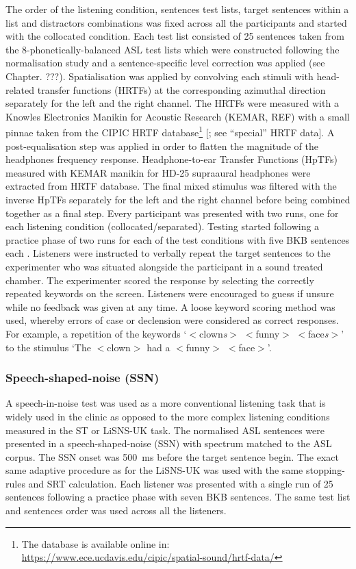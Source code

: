 \documentclass[a4paper, twoside]{templates/ociamthesis}
\begin{document}
The order of the listening condition, sentences test lists, target sentences within a list and distractors combinations was fixed across all the participants and started with the collocated condition. Each test list consisted of 25 sentences taken from the 8-phonetically-balanced ASL test lists which were constructed following the normalisation study and a sentence-specific level correction was applied (see Chapter. ???). Spatialisation was applied by convolving each stimuli with head-related transfer functions (HRTFs) at the corresponding azimuthal direction separately for the left and the right channel. The HRTFs were measured with a Knowles Electronics Manikin for Acoustic Research (KEMAR, REF) with a small pinnae taken from the CIPIC HRTF database\footnote{The database is available online in: \url{https://www.ece.ucdavis.edu/cipic/spatial-sound/hrtf-data/}} {[}\textcite{Algazi2001}; see ``special'' HRTF data{]}. A post-equalisation step was applied in order to flatten the magnitude of the headphones frequency response. Headphone-to-ear Transfer Functions (HpTFs) measured with KEMAR manikin for HD-25 supraaural headphones were extracted from \textcite{Wierstorf2011} HRTF database. The final mixed stimulus was filtered with the inverse HpTFs separately for the left and the right channel before being combined together as a final step. Every participant was presented with two runs, one for each listening condition (collocated/separated). Testing started following a practice phase of two runs for each of the test conditions with five BKB sentences each \autocite{Bench1979}. Listeners were instructed to verbally repeat the target sentences to the experimenter who was situated alongside the participant in a sound treated chamber. The experimenter scored the response by selecting the correctly repeated keywords on the screen. Listeners were encouraged to guess if unsure while no feedback was given at any time. A loose keyword scoring method was used, whereby errors of case or declension were considered as correct responses. For example, a repetition of the keywords `\(<\)clown\emph{s}\(>\) \(<\)funny\(>\) \(<\)face\emph{s}\(>\)' to the stimulus `The \(<\)clown\(>\) had a \(<\)funny\(>\) \(<\)face\(>\)'.

\hypertarget{speech-shaped-noise-ssn}{%
\subsubsection{Speech-shaped-noise (SSN)}\label{speech-shaped-noise-ssn}}

A speech-in-noise test was used as a more conventional listening task that is widely used in the clinic as opposed to the more complex listening conditions measured in the ST or LiSNS-UK task. The normalised ASL sentences were presented in a speech-shaped-noise (SSN) with spectrum matched to the ASL corpus. The SSN onset was 500~ms before the target sentence begin. The exact same adaptive procedure as for the LiSNS-UK was used with the same stopping-rules and SRT calculation. Each listener was presented with a single run of 25 sentences following a practice phase with seven BKB sentences. The same test list and sentences order was used across all the listeners.
\end{document}

